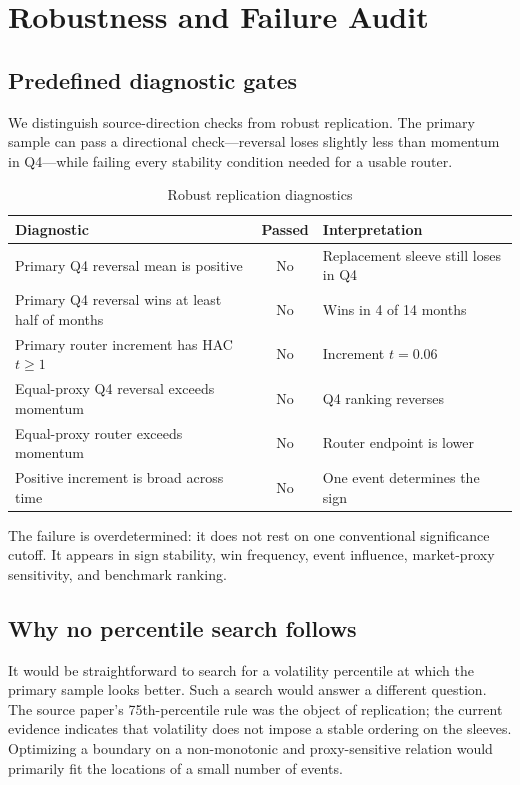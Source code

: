 \section{Robustness and Failure Audit}

\subsection{Predefined diagnostic gates}

We distinguish source-direction checks from robust replication. The primary sample can
pass a directional check---reversal loses slightly less than momentum in Q4---while
failing every stability condition needed for a usable router.

\begin{table}[H]
\centering
\caption{Robust replication diagnostics}
\label{tab:gates}
\begin{tabularx}{\textwidth}{YcY}
\toprule
Diagnostic & Passed & Interpretation \\
\midrule
Primary Q4 reversal mean is positive & No & Replacement sleeve still loses in Q4 \\
Primary Q4 reversal wins at least half of months & No & Wins in 4 of 14 months \\
Primary router increment has HAC $t\geq 1$ & No & Increment $t=0.06$ \\
Equal-proxy Q4 reversal exceeds momentum & No & Q4 ranking reverses \\
Equal-proxy router exceeds momentum & No & Router endpoint is lower \\
Positive increment is broad across time & No & One event determines the sign \\
\bottomrule
\end{tabularx}
\end{table}

The failure is overdetermined: it does not rest on one conventional significance cutoff.
It appears in sign stability, win frequency, event influence, market-proxy sensitivity,
and benchmark ranking.

\subsection{Why no percentile search follows}

It would be straightforward to search for a volatility percentile at which the primary
sample looks better. Such a search would answer a different question. The source paper's
75th-percentile rule was the object of replication; the current evidence indicates that
volatility does not impose a stable ordering on the sleeves. Optimizing a boundary on a
non-monotonic and proxy-sensitive relation would primarily fit the locations of a small
number of events.

